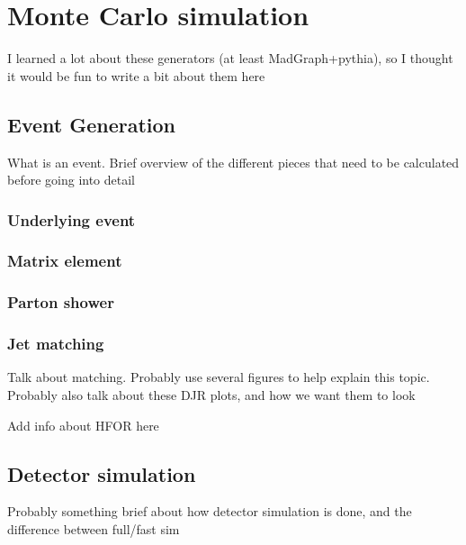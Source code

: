 \chapter[Monte Carlo simulation][Monte Carlo simulation]{Monte Carlo simulation}
\label{ch:mc}

{\color{red} I learned a lot about these generators (at least MadGraph+pythia),
  so I thought it would be fun to write a bit about them here}

\section{Event Generation}

{\color{red} What is an event. Brief overview of the different pieces that need
  to be calculated before going into detail}

\subsection{Underlying event}

\subsection{Matrix element}

\subsection{Parton shower}

\subsection{Jet matching}
\label{sec:jet_matching}

{\color{red} Talk about matching. Probably use several figures to help explain
  this topic. Probably also talk about these DJR plots, and how we want them
  to look}

{\color{red} Add info about HFOR here}

\section{Detector simulation}

{\color{red} Probably something brief about how detector simulation is done, and
  the difference between full/fast sim}

